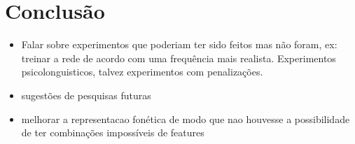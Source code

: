 \chapter{Conclusão}
\label{ch:08}
\begin{itemize}
    \item Falar sobre experimentos que poderiam ter sido feitos mas não foram, ex: treinar a rede de acordo com uma frequência mais realista. Experimentos psicolonguisticos, talvez experimentos com penalizações.
    \item sugestões de pesquisas futuras
    \item melhorar a representacao fonética de modo que nao houvesse a possibilidade de ter combinações impossíveis de features
\end{itemize}
